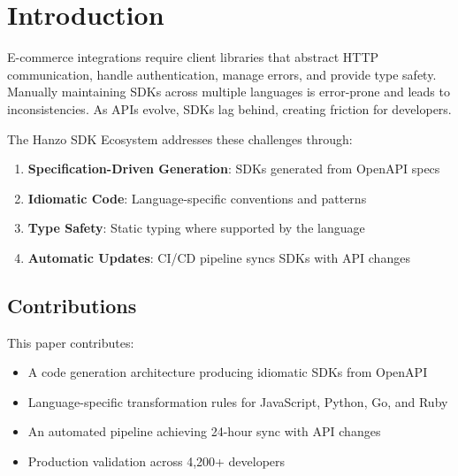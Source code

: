 \section{Introduction}


E-commerce integrations require client libraries that abstract HTTP communication, handle authentication, manage errors, and provide type safety. Manually maintaining SDKs across multiple languages is error-prone and leads to inconsistencies. As APIs evolve, SDKs lag behind, creating friction for developers.

The Hanzo SDK Ecosystem addresses these challenges through:

\begin{enumerate}
    \item \textbf{Specification-Driven Generation}: SDKs generated from OpenAPI specs
    \item \textbf{Idiomatic Code}: Language-specific conventions and patterns
    \item \textbf{Type Safety}: Static typing where supported by the language
    \item \textbf{Automatic Updates}: CI/CD pipeline syncs SDKs with API changes
\end{enumerate}

\subsection{Contributions}

This paper contributes:

\begin{itemize}
    \item A code generation architecture producing idiomatic SDKs from OpenAPI
    \item Language-specific transformation rules for JavaScript, Python, Go, and Ruby
    \item An automated pipeline achieving 24-hour sync with API changes
    \item Production validation across 4,200+ developers
\end{itemize}

